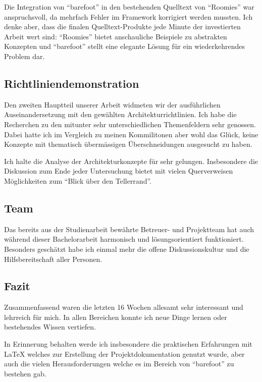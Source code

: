 Die Integration von ``barefoot'' in den bestehenden Quelltext von ``Roomies'' war anspruchsvoll, da mehrfach Fehler im Framework korrigiert werden mussten. Ich denke aber, dass die finalen Quelltext-Produkte jede Minute der investierten Arbeit wert sind: ``Roomies'' bietet anschauliche Beispiele zu abstrakten Konzepten und ``barefoot'' stellt eine elegante Lösung für ein wiederkehrendes Problem dar.


\subsection*{Richtliniendemonstration}

Den zweiten Hauptteil unserer Arbeit widmeten wir der ausführlichen Auseinandersetzung mit den gewählten Architekturrichtlinien. Ich habe die Recherchen zu den mitunter sehr unterschiedlichen Themenfeldern sehr genossen. Dabei hatte ich im Vergleich zu meinen Kommilitonen aber wohl das Glück, keine Konzepte mit thematisch übermässigen Überschneidungen ausgesucht zu haben.

Ich halte die Analyse der Architekturkonzepte für sehr gelungen. Insbesondere die Diskussion zum Ende jeder Untersuchung bietet mit vielen Querverweisen Möglichkeiten zum ``Blick über den Tellerrand''.


\subsection*{Team}

Das bereits aus der Studienarbeit bewährte Betreuer- und Projektteam hat auch während dieser Bachelorarbeit harmonisch und lösungsorientiert funktioniert. Besonders geschätzt habe ich einmal mehr die offene Diskussionskultur und die Hilfsbereitschaft aller Personen.


\subsection*{Fazit}

Zusammenfassend waren die letzten 16 Wochen allesamt sehr interessant und lehrreich für mich. In allen Bereichen konnte ich neue Dinge lernen oder bestehendes Wissen vertiefen.

In Erinnerung behalten werde ich insbesondere die praktischen Erfahrungen mit LaTeX welches zur Erstellung der Projektdokumentation genutzt wurde, aber auch die vielen Herausforderungen welche es im Bereich von ``barefoot'' zu bestehen gab.
